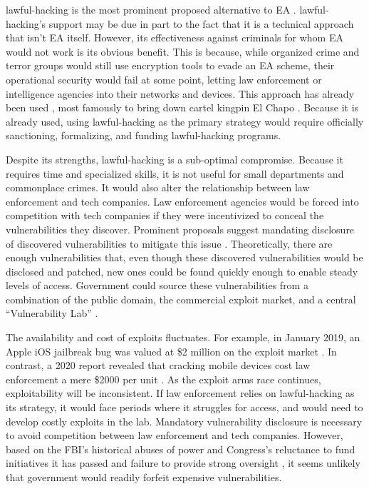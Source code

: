 \Ac{lawful-hacking} is the most prominent proposed alternative to \ac{EA} \cite{bellovin_lawful_2013}
\cite{hennessey_lawful_2016} \cite{rozenshtein_wicked_2018} \cite{kerr_encryption_2017} \cite{soesanto_2018}.
\Ac{lawful-hacking}'s support may be due in part to the fact that it is a technical approach that isn't \ac{EA} itself.
However, its effectiveness against criminals for whom \ac{EA} would not work is its obvious benefit. This is because,
while organized crime and terror groups would still use encryption tools to evade an \ac{EA} scheme, their operational
security would fail at some point, letting law enforcement or intelligence agencies into their networks and devices.
This approach has already been used \cite{cox_2020}, most famously to bring down cartel kingpin El Chapo
\cite{feuer_chapo_2019}. Because it is already used, using \ac{lawful-hacking} as the primary strategy would require
officially sanctioning, formalizing, and funding \ac{lawful-hacking} programs.

Despite its strengths, \ac{lawful-hacking} is a sub-optimal compromise. Because it requires time and specialized skills,
it is not useful for small departments and commonplace crimes. It would also alter the relationship between law
enforcement and tech companies. Law enforcement agencies would be forced into competition with tech companies if they
were incentivized to conceal the vulnerabilities they discover. Prominent proposals suggest mandating disclosure of
discovered vulnerabilities to mitigate this issue \cite{bellovin_lawful_2013} \cite{hennessey_lawful_2016}.
Theoretically, there are enough vulnerabilities that, even though these discovered vulnerabilities would be disclosed and
patched, new ones could be found quickly enough to enable steady levels of access. Government could source these
vulnerabilities from a combination of the public domain, the commercial exploit market, and a central ``Vulnerability
Lab'' \cite{bellovin_lawful_2013}.

The availability and cost of exploits fluctuates. For example, in January 2019, an Apple iOS jailbreak bug was valued at
\$2 million on the exploit market \cite{goodin_zeroday_2019}. In contrast, a 2020 report revealed that cracking mobile
devices cost law enforcement a mere \$2000 per unit \cite{koepke_2020}. As the exploit arms race continues,
exploitability will be inconsistent. If law enforcement relies on \ac{lawful-hacking} as its strategy, it would face
periods where it struggles for access, and would need to develop costly exploits in the lab. Mandatory vulnerability
disclosure is necessary to avoid competition between law enforcement and tech companies. However, based on the
\ac{FBI}'s historical abuses of power \cite{shamsi_2011} and Congress's reluctance to fund initiatives it has passed
\cite{keller_internet_2019} and failure to provide strong oversight \cite{johnson_congressional_2004}, it seems unlikely
that government would readily forfeit expensive vulnerabilities.

